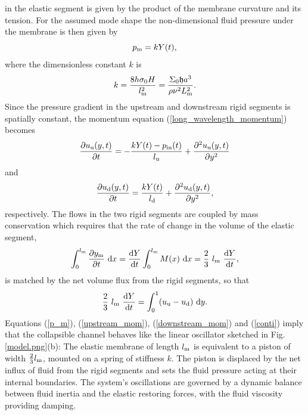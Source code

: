\documentclass[aps,prl,reprint,superscriptaddress,floatfix]{revtex4-1}
\newcommand{\be}{\begin{equation}}
\newcommand{\ee}{\end{equation}}
\begin{document}
in the elastic segment is given by the product
of the membrane curvature and its tension. For the assumed mode shape
the non-dimensional fluid pressure under the membrane is then given by
\be
\label{p_m}
p_{\rm m} = k Y(t),
\ee
where the dimensionless constant $k$ is
\be
k = \frac{8 h \sigma_0 H}{l_{\rm m}^2}
= \frac{\Sigma_0 \mathfrak{h}a^3}{\rho \nu^2 L_{\rm m}^2}.
\ee
Since the pressure gradient in the upstream and downstream rigid
segments is spatially constant, the momentum equation
(\ref{long_wavelength_momentum}) becomes
\be
\label{upstream_mom}
\frac{\partial u_{\rm u}(y,t)}{\partial t} =
-\frac{k Y(t) - p_{\rm in}(t)}{l_{\rm u}} +
\frac{\partial^2 u_{\rm u}(y,t)}{\partial y^2}
\ee
and
\be
\label{downstream_mom}
\frac{\partial u_{\rm d}(y,t)}{\partial t} =
\frac{k Y(t)}{l_{\rm d}} +
\frac{\partial^2 u_{\rm d}(y,t)}{\partial y^2},
\ee
respectively.
The flows in the two rigid segments are coupled by
mass conservation which requires that the
rate of change in the volume of the elastic segment,
\be
\int_0^{l_{\rm m}} \frac{\partial y_{\rm m}}{\partial t} \ {\rm d}x =
\frac{{\rm d}Y}{{\rm d}t} \int_0^{l_{\rm m}} M(x) \ {\rm d}x  = 
\frac{2}{3} \ l_{\rm m} \ \frac{{\rm d}Y}{{\rm d}t},
\ee
is matched by the net volume flux from the rigid segments, so that
\be
\label{conti}
\frac{2}{3} \ l_{\rm m}  \ \frac{{\rm d}Y}{{\rm d}t}
= \int_0^1  (u_{\rm u} - u_{\rm d} ) \ {\rm d}y.
\ee
Equations (\ref{p_m}), (\ref{upstream_mom}), (\ref{downstream_mom})
and (\ref{conti}) imply that the collapsible
channel behaves like the linear oscillator sketched in 
Fig. \ref{model.png}(b): The elastic membrane of length $l_{\rm m}$
is equivalent to a piston of width $\frac{2}{3}l_{\rm m}$, mounted on a spring
of stiffness $k$. The piston is displaced by the net influx of
fluid from the rigid segments and sets the fluid pressure acting at
their internal boundaries. The system's oscillations are
governed by a dynamic balance between fluid inertia and the
elastic restoring forces, with the fluid viscosity providing
damping.
\end{document}
